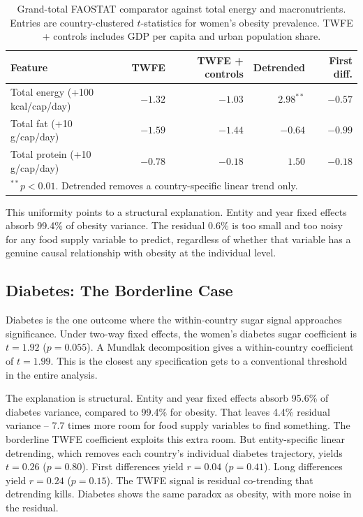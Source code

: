 \begin{table}[htbp]
\centering
\caption{Grand-total FAOSTAT comparator against total energy and macronutrients. Entries are country-clustered $t$-statistics for women's obesity prevalence. TWFE + controls includes GDP per capita and urban population share.}
\label{tab:energy_comparator}
\small
\begin{tabular}{lrrrr}
\toprule
Feature & TWFE & TWFE + controls & Detrended & First diff. \\
\midrule
Total energy (+100 kcal/cap/day) & $-1.32$ & $-1.03$ & $2.98^{**}$ & $-0.57$ \\
Total fat (+10 g/cap/day) & $-1.59$ & $-1.44$ & $-0.64$ & $-0.99$ \\
Total protein (+10 g/cap/day) & $-0.78$ & $-0.18$ & $1.50$ & $-0.18$ \\
\bottomrule
\multicolumn{5}{l}{\footnotesize $^{**}p < 0.01$. Detrended removes a country-specific linear trend only.}
\end{tabular}
\end{table}

This uniformity points to a structural explanation. Entity and year fixed effects absorb 99.4\% of obesity variance. The residual 0.6\% is too small and too noisy for any food supply variable to predict, regardless of whether that variable has a genuine causal relationship with obesity at the individual level.

\subsection{Diabetes: The Borderline Case}

Diabetes is the one outcome where the within-country sugar signal approaches significance. Under two-way fixed effects, the women's diabetes sugar coefficient is $t = 1.92$ ($p = 0.055$). A Mundlak decomposition gives a within-country coefficient of $t = 1.99$. This is the closest any specification gets to a conventional threshold in the entire analysis.

The explanation is structural. Entity and year fixed effects absorb 95.6\% of diabetes variance, compared to 99.4\% for obesity. That leaves 4.4\% residual variance -- 7.7 times more room for food supply variables to find something. The borderline TWFE coefficient exploits this extra room. But entity-specific linear detrending, which removes each country's individual diabetes trajectory, yields $t = 0.26$ ($p = 0.80$). First differences yield $r = 0.04$ ($p = 0.41$). Long differences yield $r = 0.24$ ($p = 0.15$). The TWFE signal is residual co-trending that detrending kills. Diabetes shows the same paradox as obesity, with more noise in the residual.

